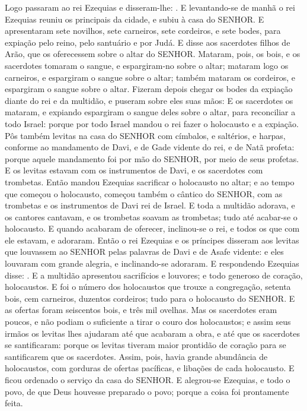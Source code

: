 {  Logo passaram ao rei Ezequias e disseram-lhe: .
  E levantando-se de manhã o rei Ezequias reuniu os principais da cidade, e subiu à casa do SENHOR.
  E apresentaram sete novilhos, sete carneiros, sete cordeiros, e sete bodes, para expiação pelo reino, pelo santuário e por Judá. E disse aos sacerdotes filhos de Arão, que os oferecessem sobre o altar do SENHOR.
  Mataram, pois, os bois, e os sacerdotes tomaram o sangue, e espargiram-no sobre o altar; mataram logo os carneiros, e espargiram o sangue sobre o altar; também mataram os cordeiros, e espargiram o sangue sobre o altar. %
  Fizeram depois chegar os bodes da expiação diante do rei e da multidão, e puseram sobre eles suas mãos:
  E os sacerdotes os mataram, e expiando espargiram o sangue deles sobre o altar, para reconciliar a todo Israel: porque por todo Israel mandou o rei fazer o holocausto e a expiação.
  Pôs também levitas na casa do SENHOR com címbalos, e saltérios, e harpas, conforme ao mandamento de Davi, e de Gade vidente do rei, e de Natã profeta: porque aquele mandamento foi por mão do SENHOR, por meio de seus profetas.
  E os levitas estavam com os instrumentos de Davi, e os sacerdotes com trombetas.
  Então mandou Ezequias sacrificar o holocausto no altar; e ao tempo que começou o holocausto, começou também o cântico do SENHOR, com as trombetas e os instrumentos de Davi rei de Israel.
  E toda a multidão adorava, e os cantores cantavam, e os trombetas soavam as trombetas; tudo até acabar-se o holocausto.
  E quando acabaram de oferecer, inclinou-se o rei, e todos os que com ele estavam, e adoraram.
  Então o rei Ezequias e os príncipes disseram aos levitas que louvassem ao SENHOR pelas palavras de Davi e de Asafe vidente: e eles louvaram com grande alegria, e inclinando-se adoraram.
  E respondendo Ezequias disse: . E a multidão apresentou sacrifícios e louvores; e todo generoso de coração, holocaustos.
  E foi o número dos holocaustos que trouxe a congregação, setenta bois, cem carneiros, duzentos cordeiros; tudo para o holocausto do SENHOR.
  E as ofertas foram seiscentos bois, e três mil ovelhas.
  Mas os sacerdotes eram poucos, e não podiam o suficiente a tirar o couro dos holocaustos; e assim seus irmãos os levitas lhes ajudaram até que acabaram a obra, e até que os sacerdotes se santificaram: porque os levitas tiveram maior prontidão de coração para se santificarem que os sacerdotes.
  Assim, pois, havia grande abundância de holocaustos, com gorduras de ofertas pacíficas, e libações de cada holocausto. E ficou ordenado o serviço da casa do SENHOR.
  E alegrou-se Ezequias, e todo o povo, de que Deus houvesse preparado o povo; porque a coisa foi prontamente feita.
\par }

